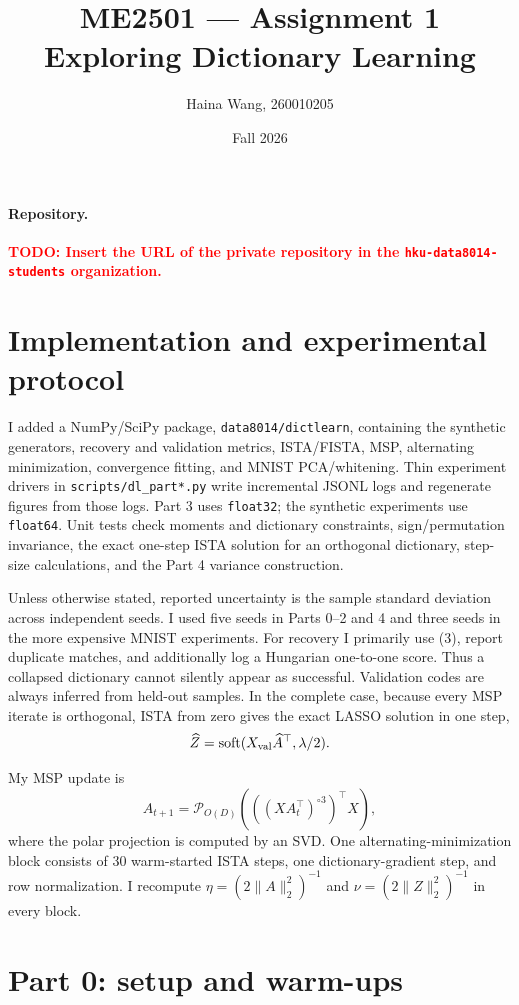 \documentclass[11pt]{article}
\title{ME2501 --- Assignment 1\\Exploring Dictionary Learning}
\author{Haina Wang, 260010205 }
\date{Fall 2026}
\newcommand{\todo}[1]{\textcolor{red}{\textbf{TODO: #1}}}
\begin{document}
\maketitle

\paragraph{Repository.}
\todo{Insert the URL of the private repository in the
\texttt{hku-data8014-students} organization.}

\section{Implementation and experimental protocol}

I added a NumPy/SciPy package, \texttt{data8014/dictlearn}, containing the
synthetic generators, recovery and validation metrics, ISTA/FISTA, MSP,
alternating minimization, convergence fitting, and MNIST PCA/whitening.  Thin
experiment drivers in \texttt{scripts/dl\_part*.py} write incremental JSONL
logs and regenerate figures from those logs.  Part 3 uses \texttt{float32};
the synthetic experiments use \texttt{float64}.  Unit tests check moments and
dictionary constraints, sign/permutation invariance, the exact one-step ISTA
solution for an orthogonal dictionary, step-size calculations, and the Part 4
variance construction.

Unless otherwise stated, reported uncertainty is the sample standard deviation
across independent seeds.  I used five seeds in Parts 0--2 and 4 and three
seeds in the more expensive MNIST experiments.  For recovery I primarily use
(3), report duplicate matches, and additionally log a Hungarian one-to-one
score.  Thus a collapsed dictionary cannot silently appear as successful.
Validation codes are always inferred from held-out samples.  In the complete
case, because every MSP iterate is orthogonal, ISTA from zero gives the exact
LASSO solution in one step,
\[
  \widehat Z=\operatorname{soft}(X_{\rm val}\widehat A^\top,\lambda/2).
\]

My MSP update is
\[
 A_{t+1}=\mathcal P_{O(D)}\!\left(
       ((XA_t^\top)^{\circ 3})^\top X\right),
\]
where the polar projection is computed by an SVD.  One alternating-minimization
block consists of 30 warm-started ISTA steps, one dictionary-gradient step,
and row normalization.  I recompute
$\eta=(2\|A\|_2^2)^{-1}$ and $\nu=(2\|Z\|_2^2)^{-1}$ in every block.

\section{Part 0: setup and warm-ups}
\end{document}
